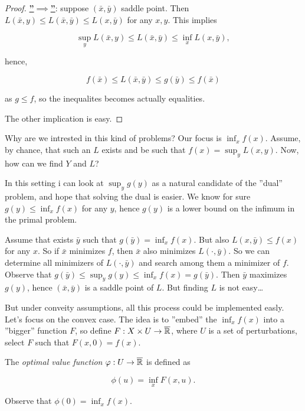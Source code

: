 \begin{proof}
    
    \underline{\textbf{''$\implies$''}}: suppose $(\bar{x},\bar{y})$ saddle point. Then $L(\bar{x},y) \le L(\bar{x},\bar{y}) \le L(x,\bar{y})$ for any $x,y$. This implies 

    \[ \sup_y L(\bar{x},y) \le L(\bar{x},\bar{y}) \le \inf_x L(x,\bar{y}), \]

    hence,

    \[ f(\bar{x}) \le L(\bar{x},\bar{y}) \le g(\bar{y}) \le f(\bar{x}) \]

    as $g \le f$, so the inequalites becomes actually equalities.

    The other implication is easy.

\end{proof}

Why are we intrested in this kind of problems? Our focus is $\inf_x f(x)$. Assume, by chance, that such an $L$ exists and be such that $f(x) = \sup_y L(x,y)$. Now, how can we find $Y$ and $L$?

In this setting i can look at $\sup_y g(y)$ as a natural candidate of the ''dual'' problem, and hope that solving the dual is easier. We know for sure $g(y) \le \inf_x f(x)$ for any $y$, hence $g(y)$ is a lower bound on the infimum in the primal problem. 

Assume that exists $\bar{y}$ such that $g(\bar{y}) = \inf_x f(x)$. But also $L(x,\bar{y}) \le f(x)$ for any $x$. So if $\bar{x}$ minimizes $f$, then $\bar{x}$ also minimizes $L(\cdot,\bar{y})$. So we can determine all minimizers of $L(\cdot,\bar{y})$ and search among them a minimizer of $f$. Observe that $g(\bar{y}) \le  \sup_y g(y) \le \inf_x f(x) = g(\bar{y})$. Then $\bar{y}$ maximizes $g(y)$, hence $(\bar{x},\bar{y})$ is a saddle point of $L$. But finding $L$ is not easy\dots

But under conveity assumptions, all this process could be implemented easly. Let's focus on the convex case. The idea is to ''embed'' the $\inf_x f(x)$ into a ''bigger'' function $F$, so define $F : X \times U \to \overline{\mathbb{R}}$, where $U$ is a set of perturbations, select $F$ such that $F(x,0) = f(x)$.

\begin{definition}
    
    The \emph{optimal value function} $\varphi : U \to \overline{\mathbb{R}}$ is defined as 

    \[ \phi(u) = \inf_x F(x,u). \]

    Observe that $\phi(0) = \inf_x f(x)$.

\end{definition}

